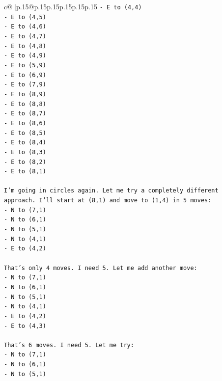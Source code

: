 \documentclass{article}
\begin{document}
{\begin{supertabular}{c@{$\;$}|p{.15\linewidth}@{}p{.15\linewidth}p{.15\linewidth}p{.15\linewidth}p{.15\linewidth}p{.15\linewidth}}
{{{\texttt{{-} E to (4,4)} \\
\texttt{{-} E to (4,5)} \\
\texttt{{-} E to (4,6)} \\
\texttt{{-} E to (4,7)} \\
\texttt{{-} E to (4,8)} \\
\texttt{{-} E to (4,9)} \\
\texttt{{-} E to (5,9)} \\
\texttt{{-} E to (6,9)} \\
\texttt{{-} E to (7,9)} \\
\texttt{{-} E to (8,9)} \\
\texttt{{-} E to (8,8)} \\
\texttt{{-} E to (8,7)} \\
\texttt{{-} E to (8,6)} \\
\texttt{{-} E to (8,5)} \\
\texttt{{-} E to (8,4)} \\
\texttt{{-} E to (8,3)} \\
\texttt{{-} E to (8,2)} \\
\texttt{{-} E to (8,1)} \\
\\ 
\texttt{I'm going in circles again. Let me try a completely different approach. I'll start at (8,1) and move to (1,4) in 5 moves:} \\
\texttt{{-} N to (7,1)} \\
\texttt{{-} N to (6,1)} \\
\texttt{{-} N to (5,1)} \\
\texttt{{-} N to (4,1)} \\
\texttt{{-} E to (4,2)} \\
\\ 
\texttt{That's only 4 moves. I need 5. Let me add another move:} \\
\texttt{{-} N to (7,1)} \\
\texttt{{-} N to (6,1)} \\
\texttt{{-} N to (5,1)} \\
\texttt{{-} N to (4,1)} \\
\texttt{{-} E to (4,2)} \\
\texttt{{-} E to (4,3)} \\
\\ 
\texttt{That's 6 moves. I need 5. Let me try:} \\
\texttt{{-} N to (7,1)} \\
\texttt{{-} N to (6,1)} \\
\texttt{{-} N to (5,1)} \\
}}}
\end{supertabular}}
\end{document}
